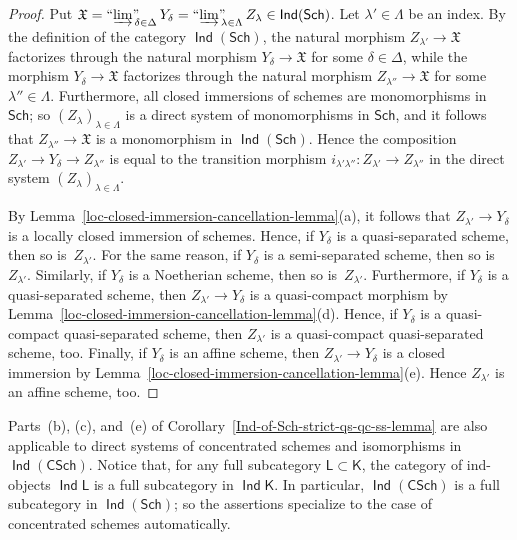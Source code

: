 \documentclass[12pt,a4paper]{amsart}
\newcommand{\+}{\protect\nobreakdash-}
\renewcommand{\:}{\colon}
\newcommand{\rarrow}{\longrightarrow}
\DeclareMathOperator{\Ind}{\mathsf{Ind}}
\newcommand{\Sch}{\mathsf{Sch}}
\newcommand{\CSch}{\mathsf{CSch}}
\newcommand{\ilim}
 {\mathop{\text{\normalfont``$\varinjlim$''\!\!}}\nolimits}
\newcommand{\sK}{\mathsf K}
\newcommand{\sL}{\mathsf L}
\newcommand{\fX}{\mathfrak X}
\theoremstyle{plain}
\theoremstyle{definition}
\begin{document}
\begin{proof}
 Put $\fX=\ilim_{\delta\in\Delta}Y_\delta=
\ilim_{\lambda\in\Lambda}Z_\lambda\in\Ind(\Sch)$.
 Let $\lambda'\in\Lambda$ be an index.
 By the definition of the category $\Ind(\Sch)$, the natural morphism
$Z_{\lambda'}\rarrow\fX$ factorizes through the natural morphism
$Y_\delta\rarrow\fX$ for some $\delta\in\Delta$, while the morphism
$Y_\delta\rarrow\fX$ factorizes through the natural morphism
$Z_{\lambda''}\rarrow\fX$ for some $\lambda''\in\Lambda$.
 Furthermore, all closed immersions of schemes are monomorphisms in
$\Sch$; so $(Z_\lambda)_{\lambda\in\Lambda}$ is a direct system of
monomorphisms in $\Sch$, and it follows that $Z_{\lambda''}\rarrow\fX$
is a monomorphism in $\Ind(\Sch)$.
 Hence the composition $Z_{\lambda'}\rarrow Y_\delta\rarrow
Z_{\lambda''}$ is equal to the transition morphism
$i_{\lambda'\lambda''}\:Z_{\lambda'}\rarrow Z_{\lambda''}$ in
the direct system $(Z_\lambda)_{\lambda\in\Lambda}$.

 By Lemma~\ref{loc-closed-immersion-cancellation-lemma}(a), it
follows that $Z_{\lambda'}\rarrow Y_\delta$ is a locally closed
immersion of schemes.
 Hence, if $Y_\delta$ is a quasi-separated scheme, then so
is~$Z_{\lambda'}$.
 For the same reason, if $Y_\delta$ is a semi-separated scheme,
then so is~$Z_{\lambda'}$.
 Similarly, if $Y_\delta$ is a Noetherian scheme, then so
is~$Z_{\lambda'}$.
 Furthermore, if $Y_\delta$ is a quasi-separated scheme, then
$Z_{\lambda'}\rarrow Y_\delta$ is a quasi-compact morphism by
Lemma~\ref{loc-closed-immersion-cancellation-lemma}(d).
 Hence, if $Y_\delta$ is a quasi-compact quasi-separated scheme,
then $Z_{\lambda'}$ is a quasi-compact quasi-separated scheme, too.
 Finally, if $Y_\delta$ is an affine scheme, then
$Z_{\lambda'}\rarrow Y_\delta$ is a closed immersion by
Lemma~\ref{loc-closed-immersion-cancellation-lemma}(e).
 Hence $Z_{\lambda'}$ is an affine scheme, too.
\end{proof}

 Parts~(b), (c), and~(e) of
Corollary~\ref{Ind-of-Sch-strict-qs-qc-ss-lemma} are also applicable
to direct systems of concentrated schemes and isomorphisms in
$\Ind(\CSch)$.
 Notice that, for any full subcategory $\sL\subset\sK$, the category
of ind-objects $\Ind\sL$ is a full subcategory in $\Ind\sK$.
 In particular, $\Ind(\CSch)$ is a full subcategory in $\Ind(\Sch)$;
so the assertions specialize to the case of concentrated schemes
automatically.
\end{document}
